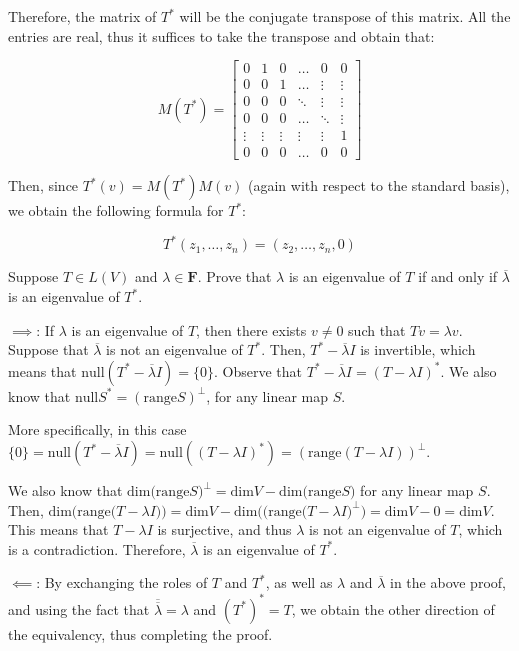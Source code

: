\begin{solution}
Therefore, the matrix of $T^*$ will be the conjugate transpose of this matrix. All the entries are real, thus it suffices to take the transpose and obtain that:

$$ M(T^*) = \begin{bmatrix} 
    0      & 1      & 0      & \ldots & 0      & 0 \\ 
    0      & 0      & 1      & \ldots & \vdots & \vdots \\ 
    0      & 0      & 0      & \ddots & \vdots & \vdots \\ 
    0      & 0      & 0      & \ldots & \ddots & \vdots \\
    \vdots & \vdots & \vdots & \vdots & \vdots & 1 \\
    0      &  0     & 0      & \ldots & 0      & 0 \end{bmatrix}$$

Then, since $T^*(v) = M(T^*)M(v)$ (again with respect to the standard basis), we obtain the following formula for $T^*$:

$$T^*(z_1, \ldots, z_n) = (z_2, \ldots, z_{n}, 0)$$
\end{solution}

\begin{exercise}{2}
    Suppose $T \in L(V)$ and $\lambda \in \mathbf{F}$. Prove that $\lambda$ is an eigenvalue of $T$ if and only if $\overline{\lambda}$ is an eigenvalue of $T^*$.
\end{exercise}

\begin{solution}

$\implies$: If $\lambda$ is an eigenvalue of $T$, then there exists $v \neq 0$ such that $Tv = \lambda v$. Suppose that $\overline{\lambda}$ is not an eigenvalue of $T^*$. Then, $T^* - \overline{\lambda}I$ is invertible, which means that $\text{null}(T^* - \overline{\lambda}I) = \{0\}$. Observe that $T^* - \overline{\lambda}I = (T - \lambda I)^*$. We also know that $\text{null} S^* = (\text{range} S)^\bot$, for any linear map $S$. 

More specifically, in this case $\{0\} = \text{null}(T^* - \overline{\lambda}I) = \text{null}((T - \lambda I)^*) = (\text{range}(T - \lambda I))^\bot$.

We also know that $\text{dim(range}S)^\bot = \text{dim} V - \text{dim(range} S)$ for any linear map $S$. Then, $\text{dim(range(} T - \lambda I)) = \text{dim} V - \text{dim((range(} T - \lambda I)^\bot) = \text{dim} V - 0 = \text{dim} V$. This means that $T - \lambda I$ is surjective, and thus $\lambda$ is not an eigenvalue of $T$, which is a contradiction. Therefore, $\overline{\lambda}$ is an eigenvalue of $T^*$.

$\impliedby$: By exchanging the roles of $T$ and $T^*$, as well as $\lambda$ and $\overline{\lambda}$ in the above proof, and using the fact that $\overline{\overline{\lambda}} = \lambda$ and $(T^*)^* = T$, we obtain the other direction of the equivalency, thus completing the proof.
    
\end{solution}

